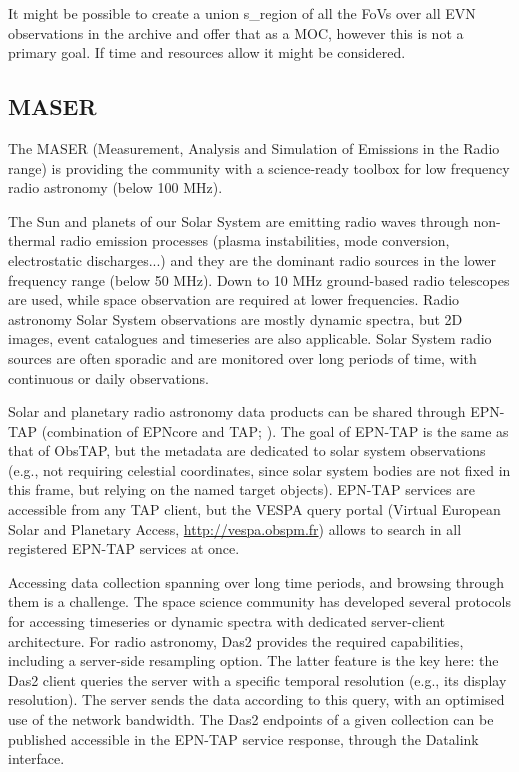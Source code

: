 \documentclass[11pt,a4paper]{ivoatex/ivoa}
\begin{document}
{It might be possible to create a union s\_region of all the FoVs over all EVN observations in the 
archive and offer that as a MOC, however this is not a primary goal. If time and resources allow it 
might be considered.



\subsection{MASER}
\label{sec:maser}

The MASER (Measurement, Analysis and Simulation of Emissions in the Radio range) is providing the 
community with a science-ready toolbox for low frequency radio astronomy (below 100 MHz). 

The Sun and planets of our Solar System are emitting radio waves through non-thermal radio emission 
processes (plasma instabilities, mode conversion, electrostatic discharges...) and they are the dominant 
radio sources in the lower frequency range (below 50 MHz). Down to 10 MHz ground-based radio telescopes
are used, while space observation are required at lower frequencies. Radio astronomy Solar System 
observations are mostly dynamic spectra, but 2D images, event catalogues and timeseries are also 
applicable. Solar System radio sources are often sporadic and are monitored over long periods of time, 
with continuous or daily observations. 

Solar and planetary radio astronomy data products can be shared through EPN-TAP (combination of EPNcore 
and TAP; \cite{std:EPNTAP}). The goal of EPN-TAP is the same as that of ObsTAP, but the metadata are 
dedicated to solar system observations (e.g., not requiring celestial coordinates, since solar system 
bodies are not fixed in this frame, but relying on the named target objects). EPN-TAP services are 
accessible from any TAP client, but the VESPA query portal (Virtual European Solar and Planetary Access, 
\url{http://vespa.obspm.fr}) allows to search in all registered EPN-TAP services at once.

Accessing data collection spanning over long time periods, and browsing through them is a challenge. 
The space science community has developed several protocols for accessing timeseries or dynamic spectra 
with dedicated server-client architecture. For radio astronomy, Das2 \citep{10.1002/essoar.10500359.1} 
provides the required capabilities, including a server-side resampling option. The latter feature is 
the key here: the Das2 client queries the server with a specific temporal resolution (e.g., its display
resolution). The server sends the data according to this query, with an optimised use of the network
bandwidth. The Das2 endpoints of a given collection can be published accessible in the EPN-TAP service 
response, through the Datalink interface.

}
\end{document}
